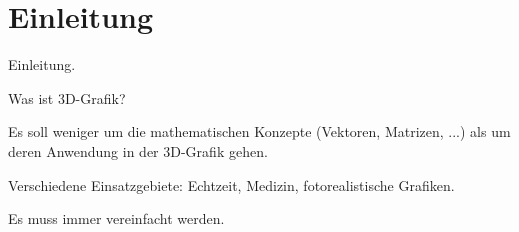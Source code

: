 \chapter{Einleitung}

Einleitung.

Was ist 3D-Grafik?

Es soll weniger um die mathematischen Konzepte (Vektoren, Matrizen, ...) als um deren Anwendung in der 3D-Grafik gehen.

Verschiedene Einsatzgebiete: Echtzeit, Medizin, fotorealistische Grafiken.

Es muss immer vereinfacht werden.